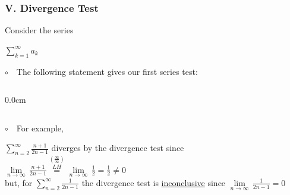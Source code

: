 \begin{frame}
\frametitle{V. Divergence Test}
\scriptsize

Consider the series 

\begin{center}
	$\sum \limits_{k = 1}^{\infty} a_k$
\end{center}

$\circ$ \,\, The following statement gives our first series test:

\vspace{0.4cm}

\begin{columns}\begin{column}{0.0cm}\end{column}\end{columns}

\vspace{0.4cm}

$\circ$ \,\, For example,
\begin{center}
	$\sum \limits_{n=2}^{\infty} \frac{n+1}{2n-1}$ \quad diverges by the divergence test since \quad $\lim \limits_{n \to \infty}\,\frac{n+1}{2n-1} \overset{\left(\frac{\infty}{\infty}\right)}{\overset{LH}{=}} \lim \limits_{n \to \infty}\,\frac{1}{2} = \frac{1}{2} \ne 0$ \\
\vspace{0.4cm}
	but, for \quad $\sum \limits_{n=2}^{\infty} \frac{1}{2n-1}$ \quad the divergence test is \underline{inconclusive} since \quad $\lim \limits_{n \to \infty}\,\frac{1}{2n-1} = 0$ \\
\end{center}

\end{frame}

